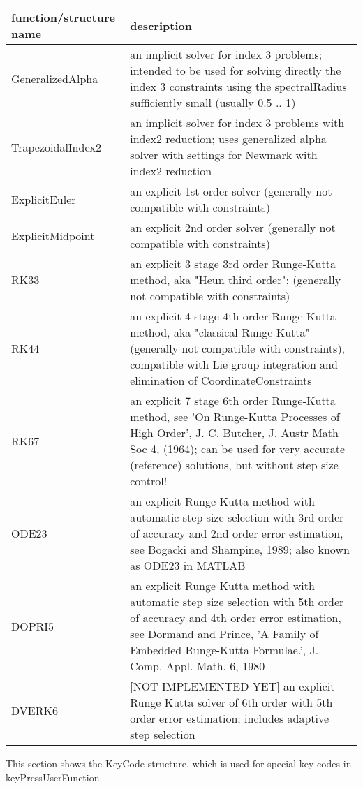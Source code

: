 \begin{center}
\footnotesize
\begin{longtable}{| p{8cm} | p{8cm} |} 
\hline
{\bf function/structure name} & {\bf description}\\ \hline
  GeneralizedAlpha & an implicit solver for index 3 problems; intended to be used for solving directly the index 3 constraints using the spectralRadius sufficiently small (usually 0.5 .. 1)\\ \hline 
  TrapezoidalIndex2 & an implicit solver for index 3 problems with index2 reduction; uses generalized alpha solver with settings for Newmark with index2 reduction\\ \hline 
  ExplicitEuler & an explicit 1st order solver (generally not compatible with constraints)\\ \hline 
  ExplicitMidpoint & an explicit 2nd order solver (generally not compatible with constraints)\\ \hline 
  RK33 & an explicit 3 stage 3rd order Runge-Kutta method, aka "Heun third order"; (generally not compatible with constraints)\\ \hline 
  RK44 & an explicit 4 stage 4th order Runge-Kutta method, aka "classical Runge Kutta" (generally not compatible with constraints), compatible with Lie group integration and elimination of CoordinateConstraints\\ \hline 
  RK67 & an explicit 7 stage 6th order Runge-Kutta method, see 'On Runge-Kutta Processes of High Order', J. C. Butcher, J. Austr Math Soc 4, (1964); can be used for very accurate (reference) solutions, but without step size control!\\ \hline 
  ODE23 & an explicit Runge Kutta method with automatic step size selection with 3rd order of accuracy and 2nd order error estimation, see Bogacki and Shampine, 1989; also known as ODE23 in MATLAB\\ \hline 
  DOPRI5 & an explicit Runge Kutta method with automatic step size selection with 5th order of accuracy and 4th order error estimation, see  Dormand and Prince, 'A Family of Embedded Runge-Kutta Formulae.', J. Comp. Appl. Math. 6, 1980\\ \hline 
  DVERK6 & [NOT IMPLEMENTED YET] an explicit Runge Kutta solver of 6th order with 5th order error estimation; includes adaptive step selection\\ \hline 
\end{longtable}
\end{center}

\label{sec:KeyCode}
This section shows the KeyCode structure, which is used for special key codes in keyPressUserFunction.



